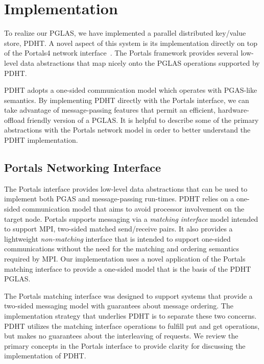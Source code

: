\section{Implementation}

To realize our PGLAS, we have implemented a parallel distributed key/value store, 
PDHT. A novel aspect of this system is its implementation directly on top of the
Portals4 network interface~\cite{portals4}. The Portals framework provides several low-level 
data abstractions that map nicely onto the PGLAS operations supported by PDHT.

PDHT adopts a one-sided communication model which operates with PGAS-like
semantics. By implementing PDHT directly with the Portals interface, we can
take advantage of message-passing features that permit an efficient,
hardware-offload friendly version of a PGLAS. It is helpful to describe
some of the primary abstractions with the Portals network model in order 
to better understand the PDHT implementation.

\subsection{Portals Networking Interface}


The Portals interface provides low-level data abstractions that can be used to
implement both PGAS and message-passing run-times. PDHT relies on a one-sided
communication model that aims to avoid processor involvement on the target
node. Portals supports messaging via a {\em matching interface} model intended to
support MPI, two-sided matched send/receive pairs. It also provides a
lightweight {\em non-matching} interface that is intended to support one-sided
communications without the need for the matching and ordering semantics
required by MPI. Our implementation uses a novel application of the Portals
matching interface to provide a one-sided model that is the basis of the PDHT
PGLAS. 

The Portals matching interface was designed to support systems that provide a
two-sided messaging model with guarantees about message ordering. The
implementation strategy that underlies PDHT is to separate these two concerns.
PDHT utilizes the matching interface operations to fulfill put and get
operations, but makes no guarantees about the interleaving of requests. We
review the primary concepts in the Portals interface to provide clarity for
discussing the implementation of PDHT.



